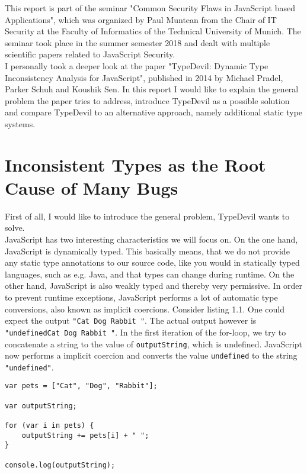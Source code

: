 \documentclass[runningheads,a4paper]{llncs}
\begin{document}
This report is part of the seminar "Common Security Flaws in JavaScript based Applications", which was organized by Paul Muntean from the Chair of IT Security at the Faculty of Informatics of the Technical University of Munich.
The seminar took place in the summer semester 2018 and dealt with multiple scientific papers related to JavaScript Security. \\
I personally took a deeper look at the paper "TypeDevil: Dynamic Type Inconsistency Analysis for JavaScript", published in 2014 by Michael Pradel, Parker Schuh and Koushik Sen.
In this report I would like to explain the general problem the paper tries to address, introduce TypeDevil as a possible solution and compare TypeDevil to an alternative approach, namely additional static type systems. 

\section{Inconsistent Types as the Root Cause of Many Bugs}
First of all, I would like to introduce the general problem, TypeDevil wants to solve. \\
JavaScript has two interesting characteristics we will focus on. 
On the one hand, JavaScript is dynamically typed. This basically means, that we do not provide any static type annotations to our source code, like you would in statically typed languages, such as e.g. Java, and that types can change during runtime.
On the other hand, JavaScript is also weakly typed and thereby very permissive. In order to prevent runtime exceptions, JavaScript performs a lot of automatic type conversions, also known as implicit coercions.
Consider listing 1.1. One could expect the output \lstinline[columns=fixed]{"Cat Dog Rabbit "}.
The actual output however is \lstinline[columns=fixed]{"undefinedCat Dog Rabbit "}. 
In the first iteration of the for-loop, we try to concatenate a string to the value of \lstinline[columns=fixed]{outputString}, which is undefined. 
JavaScript now performs a implicit coercion and converts the value \lstinline[columns=fixed]{undefined} to the string \lstinline[columns=fixed]{"undefined"}.

\lstset{language=javascript}
\begin{minipage}{\linewidth}
\begin{lstlisting}[frame=single, caption=Implicit Coercions]
var pets = ["Cat", "Dog", "Rabbit"];

var outputString;

for (var i in pets) {
    outputString += pets[i] + " ";
}

console.log(outputString);
\end{lstlisting}
\end{minipage}
\end{document}
